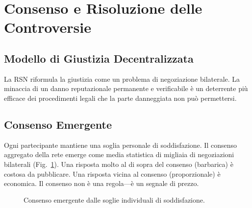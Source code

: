 \documentclass[11pt,a4paper,twocolumn]{article}
\begin{document}
\section{Consenso e Risoluzione delle Controversie}

\subsection{Modello di Giustizia Decentralizzata}

La RSN riformula la giustizia come un problema di negoziazione bilaterale. La minaccia di un danno reputazionale permanente e verificabile è un deterrente più efficace dei procedimenti legali che la parte danneggiata non può permettersi.

\subsection{Consenso Emergente}

Ogni partecipante mantiene una soglia personale di soddisfazione. Il consenso aggregato della rete emerge come media statistica di migliaia di negoziazioni bilaterali (Fig.~\ref{fig:consensus}). Una risposta molto al di sopra del consenso (barbarica) è costosa da pubblicare. Una risposta vicina al consenso (proporzionale) è economica. Il consenso non è una regola---è un segnale di prezzo.

\begin{figure}[ht]
\centering
{}
\caption{Consenso emergente dalle soglie individuali di soddisfazione.}
\label{fig:consensus}
\end{figure}
\end{document}

